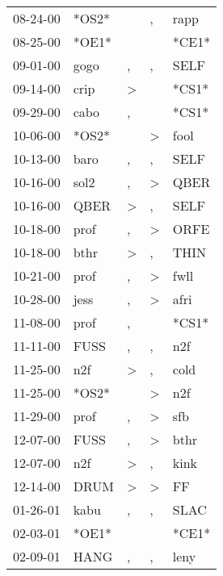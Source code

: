 \begin{supertabular}{lllll}
 08-24-00 &  *OS2* &                  &                , &   rapp \\
 08-25-00 &  *OE1* &                  &                  &  *CE1* \\
 09-01-00 &   gogo &                , &                , &   SELF \\
 09-14-00 &   crip &     \textgreater &                  &  *CS1* \\
 09-29-00 &   cabo &                , &                  &  *CS1* \\
 10-06-00 &  *OS2* &                  &     \textgreater &   fool \\
 10-13-00 &   baro &                , &                , &   SELF \\
 10-16-00 &   sol2 &                , &     \textgreater &   QBER \\
 10-16-00 &   QBER &     \textgreater &                , &   SELF \\
 10-18-00 &   prof &                , &     \textgreater &   ORFE \\
 10-18-00 &   bthr &     \textgreater &                , &   THIN \\
 10-21-00 &   prof &                , &     \textgreater &   fwll \\
 10-28-00 &   jess &                , &     \textgreater &   afri \\
 11-08-00 &   prof &                , &                  &  *CS1* \\
 11-11-00 &   FUSS &                , &                , &    n2f \\
 11-25-00 &    n2f &     \textgreater &                , &   cold \\
 11-25-00 &  *OS2* &                  &     \textgreater &    n2f \\
 11-29-00 &   prof &                , &     \textgreater &    sfb \\
 12-07-00 &   FUSS &                , &     \textgreater &   bthr \\
 12-07-00 &    n2f &     \textgreater &                , &   kink \\
 12-14-00 &   DRUM &     \textgreater &     \textgreater &     FF \\
 01-26-01 &   kabu &                , &                , &   SLAC \\
 02-03-01 &  *OE1* &                  &                  &  *CE1* \\
 02-09-01 &   HANG &                , &                , &   leny \\

\end{supertabular}
